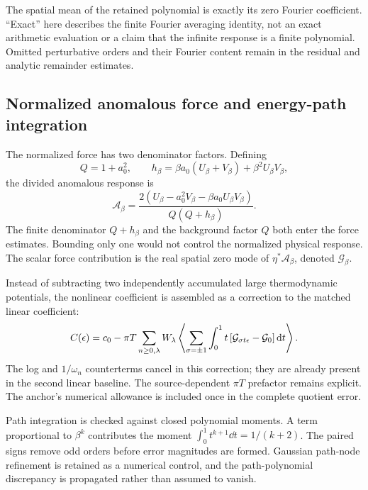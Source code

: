 The spatial mean of the retained polynomial is exactly its zero Fourier coefficient. ``Exact'' here describes the finite Fourier averaging identity, not an exact arithmetic evaluation or a claim that the infinite response is a finite polynomial. Omitted perturbative orders and their Fourier content remain in the residual and analytic remainder estimates.

\subsection{Normalized anomalous force and energy-path integration}
The normalized force has two denominator factors. Defining
\begin{equation}
 Q=1+a_0^2,\qquad h_\beta=\beta a_0(U_\beta+V_\beta)+\beta^2U_\beta V_\beta,
\end{equation}
the divided anomalous response is
\begin{equation}\label{eq:dividedforce}
 \mathcal A_\beta=
 \frac{2\left(U_\beta-a_0^2V_\beta-\beta a_0U_\beta V_\beta\right)}
 {Q\left(Q+h_\beta\right)}.
\end{equation}
The finite denominator $Q+h_\beta$ and the background factor $Q$ both enter the force estimates. Bounding only one would not control the normalized physical response. The scalar force contribution is the real spatial zero mode of $\eta^*\mathcal A_\beta$, denoted $\mathcal G_\beta$.

Instead of subtracting two independently accumulated large thermodynamic potentials, the nonlinear coefficient is assembled as a correction to the matched linear coefficient:
\begin{equation}\label{eq:path}
 C(\epsilon)=c_0-\pi T\sum_{n\ge0,\lambda}W_\lambda
 \left\langle \sum_{\sigma=\pm1}\int_0^1
 t\left[\mathcal G_{\sigma t\epsilon}-\mathcal G_0\right]\mathrm{d} t\right\rangle.
\end{equation}
The log and $1/\omega_n$ counterterms cancel in this correction; they are already present in the second linear baseline. The source-dependent $\pi T$ prefactor remains explicit. The anchor's numerical allowance is included once in the complete quotient error.

Path integration is checked against closed polynomial moments. A term proportional to $\beta^k$ contributes the moment $\int_0^1 t^{k+1}\dd t=1/(k+2)$. The paired signs remove odd orders before error magnitudes are formed. Gaussian path-node refinement is retained as a numerical control, and the path-polynomial discrepancy is propagated rather than assumed to vanish.

